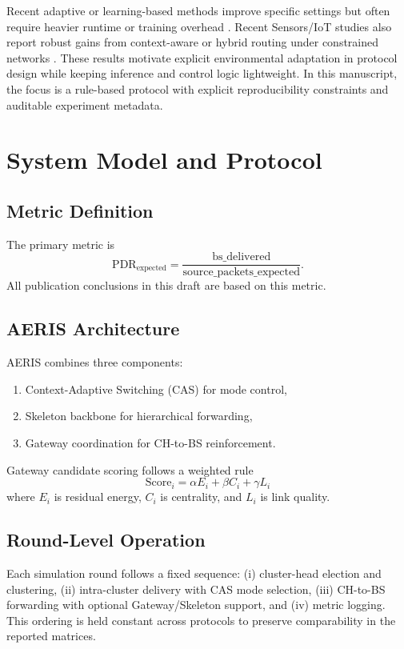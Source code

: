 \documentclass[sensors,article,submit,moreauthors,pdftex]{Definitions/mdpi}
\begin{document}
Recent adaptive or learning-based methods improve specific settings but often require heavier runtime or training overhead \cite{Ren2024,Okine2024,Chen2023Survey}. Recent Sensors/IoT studies also report robust gains from context-aware or hybrid routing under constrained networks \cite{ElFouly2023ILP,Dan2024EMRAR,Bhukya2025Hybrid}. These results motivate explicit environmental adaptation in protocol design while keeping inference and control logic lightweight. In this manuscript, the focus is a rule-based protocol with explicit reproducibility constraints and auditable experiment metadata.

\section{System Model and Protocol}
\subsection{Metric Definition}
The primary metric is
\begin{equation}
\mathrm{PDR}_{\mathrm{expected}} = \frac{\mathrm{bs\_delivered}}{\mathrm{source\_packets\_expected}}.
\end{equation}
All publication conclusions in this draft are based on this metric.

\subsection{AERIS Architecture}
AERIS combines three components:
\begin{enumerate}
\item Context-Adaptive Switching (CAS) for mode control,
\item Skeleton backbone for hierarchical forwarding,
\item Gateway coordination for CH-to-BS reinforcement.
\end{enumerate}
Gateway candidate scoring follows a weighted rule
\begin{equation}
\mathrm{Score}_i = \alpha E_i + \beta C_i + \gamma L_i
\end{equation}
where $E_i$ is residual energy, $C_i$ is centrality, and $L_i$ is link quality.

\subsection{Round-Level Operation}
Each simulation round follows a fixed sequence: (i) cluster-head election and clustering, (ii) intra-cluster delivery with CAS mode selection, (iii) CH-to-BS forwarding with optional Gateway/Skeleton support, and (iv) metric logging. This ordering is held constant across protocols to preserve comparability in the reported matrices.
\end{document}
